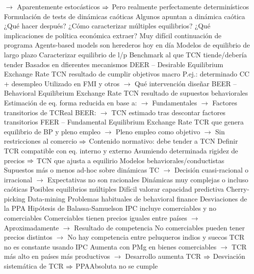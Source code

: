 \documentclass{nuevotema}
\begin{document}
\begin{esquemal}
				\4[] $\to$ Aparentemente estocásticos
				\4[] $\Rightarrow$ Pero realmente perfectamente determinísticos
				\4 Formulación de tests de dinámicas caóticas
				\4 Algunos apuntan a dinámica caótica
				\4 ¿Qué hacer después?
				\4 ¿Cómo caracterizar múltiples equilibrios?
				\4 ¿Qué implicaciones de política económica extraer?
				\4 Muy difícil continuación de programa
				\4 Agents-based models son herederos hoy en día
			\3 Modelos de equilibrio de largo plazo
				\4 Caracterizar equilibrio de l/p
				\4[] Benchmark al que TCN tiende/debería tender
				\4[] Basados en dfierentes mecanismos
				\4 DEER -- Desirable Equilibrium Exchange Rate
				\4[] TCN resultado de cumplir objetivos macro
				\4[] P.ej.: determinado CC + desempleo
				\4[] Utilizado en FMI y otros
				\4[] $\to$ Qué intervención diseñar
				\4 BEER -- Behavioral Equilibrium Exchange Rate
				\4[] TCN resultado de supuestos behaviorales
				\4[] Estimación de eq. forma reducida en base a:
				\4[] $\to$ Fundamentales
				\4[] $\to$ Factores transitorios de TCReal
				\4[] BEER:
				\4[] $\to$ TCN estimado tras descontar factores transitorios
				\4 FEER -- Fundamental Equilibrium Exchange Rate
				\4[] TCR que genera equilibrio de BP y pleno empleo
				\4[] $\to$ Pleno empleo como objetivo
				\4[] $\to$ Sin restricciones al comercio
				\4[] $\Rightarrow$ Contenido normativo: debe tender a TCN
				\4[] Definir TCR compatible con eq. interno y externo
				\4[] Asumiendo determinada rigidez de precios
				\4[] $\Rightarrow$ TCN que ajusta a equilirio
			\3 Modelos behaviorales/conductistas
				\4 Supuestos más o menos ad-hoc sobre dinámicas TC
				\4[] $\to$ Decisión cuasi-racional o irracional
				\4[] $\to$ Expectativas no son racionales
				\4 Dinámicas muy complejas o incluso caóticas
				\4 Posibles equilibrios múltiples
				\4 Difícil valorar capacidad predictiva
				\4[] Cherry-picking
				\4[] Data-mining
				\4[] Problemas habituales de behavioral finance
	\1 
		\2 Desviaciones de la PPA
			\3 Hipótesis de Balassa-Samuelson
				\4 IPC incluye comerciables y no comerciables
				\4[] Comerciables tienen precios iguales entre países
				\4[] $\to$ Aproximadamente
				\4[] $\to$ Resultado de competencia
				\4[] No comerciables pueden tener precios distintos
				\4[] $\to$ No hay competencia entre peluqueros indios y suecos
				\4 TCR no es constante usando IPC
				\4[] Aumenta con PMg en bienes comerciables
				\4[] $\to$ TCR más alto en países más productivos
				\4[] $\to$ Desarrollo aumenta TCR
				\4[] $\Rightarrow$ Desviación sistemática de TCR
				\4[] $\Rightarrow$ PPAAbsoluta no se cumple

\end{esquemal}
\end{document}
